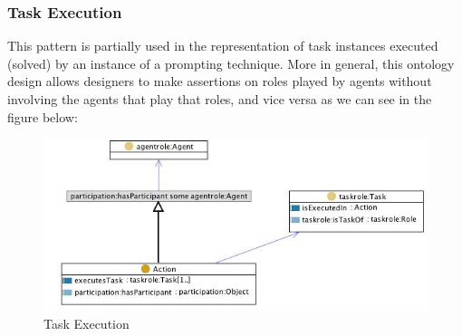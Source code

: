 \subsubsection{Task Execution}
This pattern is partially used in the representation of task instances executed (solved) by an instance of a prompting technique. More in general, this ontology design allows designers to make assertions on roles played by agents without involving the agents that play that roles, and vice versa\cite{task_execution} as we can see in the figure below:

\begin{figure}[H]
    \centering
    \includegraphics[width=0.8\linewidth]{Figures/fig_75.png}
    \caption{Task Execution}
    \label{fig:enter-label}
\end{figure}

